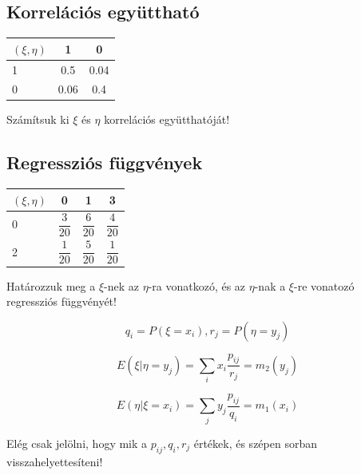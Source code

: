 \documentclass[a4paper]{article}
\newenvironment{solution}
{\color{RoyalBlue}}{\bigskip}
\begin{document}
\subsection{Korrelációs együttható}

\begin{tabular}{|l|cc|}
\hline
$(\xi, \eta)$ & 1 & 0 \\
\hline
1 & 0.5 & 0.04 \\
0 & 0.06 & 0.4 \\
\hline
\end{tabular}

Számítsuk ki $\xi$ és $\eta$ korrelációs együtthatóját!

\subsection{Regressziós függvények}

\begin{tabular}{l|c|c|c|}
$(\xi, \eta)$ & 0 & 1 & 3 \\
\hline
0 & $\dfrac{3}{20}$ & $\dfrac{6}{20}$ & $\dfrac{4}{20}$ \\
2 & $\dfrac{1}{20}$ & $\dfrac{5}{20}$ & $\dfrac{1}{20}$ \\
\hline
\end{tabular}

Határozzuk meg a $\xi$-nek az $\eta$-ra vonatkozó, és az $\eta$-nak a $\xi$-re vonatozó regressziós függvényét!

\begin{solution}
\[
q_i = P(\xi = x_i), r_j = P(\eta = y_j)
\]

\[
E(\xi|\eta = y_j) = \displaystyle\sum_i x_i \dfrac{p_{ij}}{r_j} = m_2(y_j)
\]

\[
E(\eta|\xi = x_i) = \displaystyle\sum_j y_j \dfrac{p_{ij}}{q_i} = m_1(x_i)
\]

Elég csak jelölni, hogy mik a $p_{ij}, q_i, r_j$ értékek, és szépen sorban visszahelyettesíteni!
\end{solution}
\end{document}
